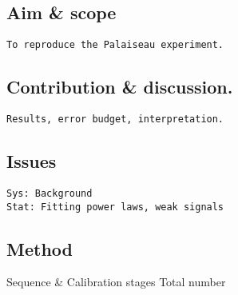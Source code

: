 \hypertarget{aim-scope}{%
\subsection{Aim \& scope}\label{aim-scope}}

\begin{verbatim}
To reproduce the Palaiseau experiment.
\end{verbatim}

\hypertarget{contribution-discussion.}{%
\subsection{Contribution \&
discussion.}\label{contribution-discussion.}}

\begin{verbatim}
Results, error budget, interpretation.
\end{verbatim}

\hypertarget{issues}{%
\subsection{Issues}\label{issues}}

\begin{verbatim}
Sys: Background
Stat: Fitting power laws, weak signals
\end{verbatim}

\hypertarget{method}{%
\subsection{Method}\label{method}}

Sequence \& Calibration stages Total number

